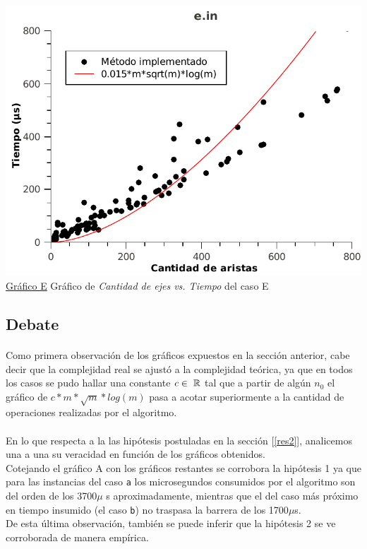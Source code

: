 \begin{center}
\vspace*{1.5cm}
\hspace*{-2.1cm}\includegraphics[scale = 0.9]{../ej2/pruebas_graficos/GraphE.pdf} \\
\underline{Gráfico E} Gráfico de \textit{Cantidad de ejes vs. Tiempo} del caso E
\end{center}



\subsection{Debate}
\label{deb2}

\paragraph{}
Como primera observación de los gráficos expuestos en la sección anterior, cabe decir que la complejidad real se ajustó a la complejidad teórica, ya que en todos los casos se pudo hallar una constante $c \in\ \mathbb{R}$ tal que a partir de algún $n_0$ el gráfico de $c*m*\sqrt{m}*log(m)$ pasa a acotar superiormente a la cantidad de operaciones realizadas por el algoritmo.

\paragraph{}
En lo que respecta a la las hipótesis postuladas en la sección [\ref{res2}], analicemos una a una su veracidad en función de los gráficos obtenidos.\\
Cotejando el gráfico A con los gráficos restantes se corrobora la hipótesis 1 ya que para las instancias del caso \texttt{a} los microsegundos consumidos por el algoritmo son del orden de los 3700$\mu$ s aproximadamente, mientras que el del caso más próximo en tiempo insumido (el caso \texttt{b}) no traspasa la barrera de los 1700$\mu$s.\\
De esta última observación, también se puede inferir que la hipótesis 2 se ve corroborada de manera empírica.

